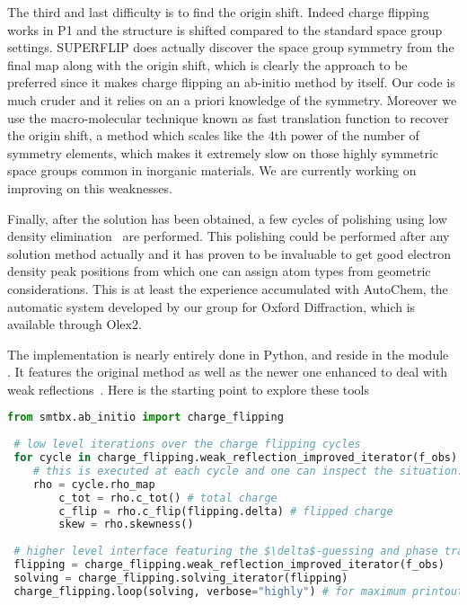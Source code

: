 \documentclass[12pt]{article}
\begin{document}
The third and last difficulty is to find the origin shift. Indeed charge flipping works in P1 and the structure is shifted compared to the standard space group settings. SUPERFLIP does actually discover the space group symmetry from the final map along with the origin shift, which is clearly the approach to be preferred since it makes charge flipping an ab-initio method by itself. Our code is much cruder and it relies on an a priori knowledge of the symmetry. Moreover we use the macro-molecular technique known as fast translation function to recover the origin shift, a method which scales like the 4th power of the number of symmetry elements, which makes it extremely slow on those highly symmetric space groups common in inorganic materials. We are currently working on improving on this weaknesses.

Finally, after the solution has been obtained, a few cycles of polishing using low density elimination~\cite{Shiono:1992} are performed. This polishing could be performed after any solution method actually and it has proven to be invaluable to get good electron density peak positions from which one can assign atom types from geometric considerations. This is at least the experience accumulated with AutoChem, the automatic system developed by our group for Oxford Diffraction, which is available through Olex2.

The implementation is nearly entirely done in Python, and reside in the module\\ . It features the original method as well as the newer one enhanced to deal with weak reflections~\cite{Oszlanyi:2004}. Here is the starting point to explore these tools
 \begin{lstlisting}[language=Python]
 from smtbx.ab_initio import charge_flipping
 
 # low level iterations over the charge flipping cycles
 for cycle in charge_flipping.weak_reflection_improved_iterator(f_obs):
 	# this is executed at each cycle and one can inspect the situation:
	rho = cycle.rho_map
        c_tot = rho.c_tot() # total charge
        c_flip = rho.c_flip(flipping.delta) # flipped charge
        skew = rho.skewness()
 
 # higher level interface featuring the $\delta$-guessing and phase transition detection
 flipping = charge_flipping.weak_reflection_improved_iterator(f_obs)
 solving = charge_flipping.solving_iterator(flipping)
 charge_flipping.loop(solving, verbose="highly") # for maximum printout 
\end{lstlisting}
\end{document}
